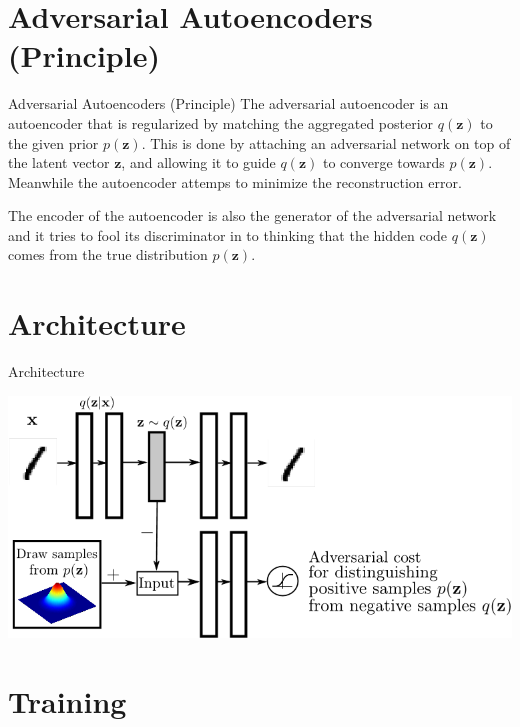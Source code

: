 \documentclass{beamer}
\begin{document}
\section{Adversarial Autoencoders (Principle)}

\begin{frame}{Adversarial Autoencoders (Principle)}
The adversarial autoencoder is an autoencoder that is regularized by matching the
aggregated posterior $q(\mathbf{z})$ to the given prior $p(\mathbf{z})$. This is done by attaching
an adversarial network on top of the latent vector $\mathbf{z}$, and allowing it to
guide $q(\mathbf{z})$ to converge towards $p(\mathbf{z})$. Meanwhile the autoencoder attemps
to minimize the reconstruction error.

The encoder of the autoencoder is also the generator of the adversarial network and
it tries to fool its discriminator in to thinking that the hidden code $q(\mathbf{z})$
comes
from the true distribution $p(\mathbf{z})$.

\end{frame}

\section{Architecture}

\begin{frame}{Architecture}

    \includegraphics[width=1\textwidth]{1-Figure1-1.png}

\end{frame}

\section{Training}
\end{document}
